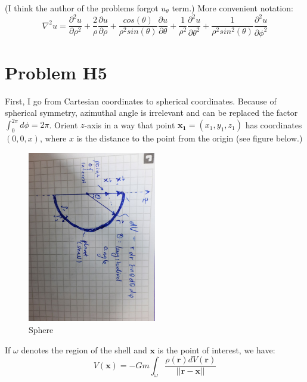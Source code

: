 \documentclass{article}
\begin{document}
(I think the author of the problems forgot $u_\theta$ term.)
More convenient notation:
\begin{equation*}
  \nabla^2 u = \frac{\partial^2 u}{\partial \rho^2} + \frac{2}{\rho} \frac{\partial u}{\partial \rho} + \frac{cos(\theta)}{\rho^2 sin(\theta)} \frac{\partial u}{\partial \theta} + \frac{1}{\rho^2} \frac{\partial^2 u}{\partial \theta^2} + \frac{1}{\rho^2sin^2(\theta)} \frac{\partial^2 u}{\partial \phi^2}
\end{equation*}
  
\section{ Problem H5 }

First, I go from Cartesian coordinates to spherical coordinates. Because of spherical symmetry, azimuthal angle is irrelevant and can be replaced the factor $\int_0^{2\pi} d\phi = 2\pi$. Orient $z$-axis in a way that point $\mathbf{x_1} = (x_1, y_1, z_1)$ has coordinates $(0, 0, x)$, where $x$ is the distance to the point from the origin (see figure below.) 

\begin{figure}[H]
  \centering
  \includegraphics[width=0.5\textwidth, angle=90]{calculus/W4/img/gravity}
  \caption{Sphere}
\end{figure}

If $\omega$ denotes the region of the shell and $\mathbf{x}$ is the point of interest, we have:
\begin{equation*}
  V(\mathbf{x}) = -Gm \int_\omega \frac{\rho(\mathbf{r}) dV(\mathbf{r})}{||\mathbf{r} - \mathbf{x} ||}
\end{equation*}
\end{document}
